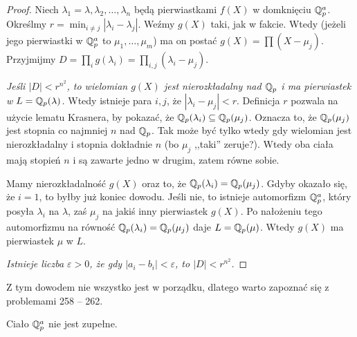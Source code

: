 \begin{proof}
	Niech $\lambda_1 = \lambda, \lambda_2, \dots, \lambda_n$ będą pierwiastkami $f(X)$ w domknięciu $\mathbb Q_p^a$. Określmy $r = \min_{i \neq j} |\lambda_i - \lambda_j|$.
	Weźmy $g(X)$ taki, jak w fakcie.
	Wtedy (jeżeli jego pierwiastki w $\mathbb Q_p^a$ to $\mu_1, \dots, \mu_m$) ma on postać $g(X) = \prod (X - \mu_j)$.
	Przyjmijmy $D = \prod_i g(\lambda_i) = \prod_{i,j} (\lambda_i - \mu_j)$.

	\emph{Jeśli $|D| < r^{n^2}$, to wielomian $g(X)$ jest nierozkładalny nad $\mathbb Q_p$ i ma pierwiastek w $L = \mathbb Q_p(\lambda)$.}
	Wtedy istnieje para $i, j$, że $|\lambda_i - \mu_j| < r$.
	Definicja $r$ pozwala na użycie lematu Krasnera, by pokazać, że $\mathbb Q_p(\lambda_i) \subseteq \mathbb Q_p(\mu_j)$.
	Oznacza to, że $\mathbb Q_p(\mu_j)$ jest stopnia co najmniej $n$ nad $\mathbb Q_p$.
	Tak może być tylko wtedy gdy wielomian jest nierozkładalny i stopnia dokładnie $n$ (bo $\mu_j$ ,,taki'' zeruje?). 
	Wtedy oba ciała mają stopień $n$ i są zawarte jedno w drugim, zatem równe sobie.

	Mamy nierozkładalność $g(X)$ oraz to, że $\mathbb Q_p(\lambda_i) = \mathbb Q_p(\mu_j)$.
	Gdyby okazało się, że $i = 1$, to byłby już koniec dowodu.
	Jeśli nie, to istnieje automorfizm $\mathbb Q_p^a$, który posyła $\lambda_i$ na $\lambda$, zaś $\mu_j$ na jakiś inny pierwiastek $g(X)$.
	Po nałożeniu tego automorfizmu na równość $\mathbb Q_p(\lambda_i) = \mathbb Q_p(\mu_j)$ daje $L = \mathbb Q_p(\mu)$.
	Wtedy $g(X)$ ma pierwiastek $\mu$ w $L$.

	\emph{Istnieje liczba $\varepsilon > 0$, że gdy $|a_i - b_i| < \varepsilon$, to $|D|<r^{n^2}$.}
\end{proof}

Z tym dowodem nie wszystko jest w porządku, dlatego warto zapoznać się z problemami 258 -- 262.

\begin{fakt}\label{timoris}
	Ciało ${\mathbb Q}^a_p$ nie jest zupełne.
\end{fakt}

